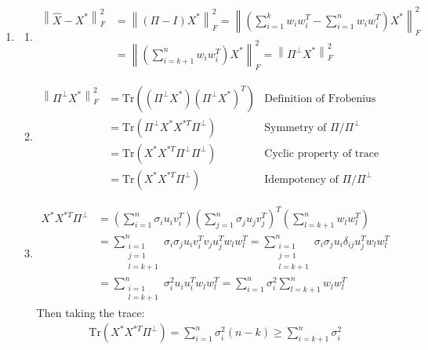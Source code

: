 \documentclass{article}
\newcommand{\norm}[1]{\left\|#1\right\|}
\begin{document}
\begin{enumerate}
    \item
    \begin{enumerate}
        \item
        \begin{align*}
            \norm{\hat{X} - X^*}_F^2 
            &= \norm{(\Pi - I)X^*}_F^2
            = \norm{\left(\sum_{i=1}^k w_i w_i^T - \sum_{i=1}^n w_i w_i^T \right)X^*}_F^2 \\
            &= \norm{\left(\sum_{i=k+1}^n w_i w_i^T\right)X^*}_F^2
            = \norm{\Pi^\perp X^*}_F^2
        \end{align*}

        \item
        \begin{align*}
            \norm{\Pi^\perp X^*}_F^2 
            &= \mathrm{Tr}((\Pi^\perp X^*) (\Pi^\perp X^*)^T) & \text{Definition of Frobenius Norm}\\
            &= \mathrm{Tr}(\Pi^\perp X^* X^{*T} \Pi^\perp) & \text{Symmetry of } \Pi / \Pi^\perp \\
            &= \mathrm{Tr}(X^* X^{*T} \Pi^\perp \Pi^\perp) & \text{Cyclic property of trace} \\
            &= \mathrm{Tr}(X^* X^{*T} \Pi^\perp) & \text{Idempotency of } \Pi / \Pi^\perp
        \end{align*}

        \item 
        \begin{align*}    
            X^* X^{*T} \Pi^\perp
            &= \left( \sum_{i=1}^n \sigma_i u_i v_i^T \right)
            \left( \sum_{j=1}^n \sigma_j u_j v_j^T \right)^T
            \left( \sum_{l=k+1}^n w_l w_l^T \right) \\
            &= \sum_{\substack{i=1 \\ j=1 \\ l=k+1}}^n 
            \sigma_i \sigma_j u_i v_i^T v_j u_j^T w_l w_l^T
            = \sum_{\substack{i=1 \\ j=1 \\ l=k+1}}^n
            \sigma_i \sigma_j u_i \delta_{ij} u_j^T w_l w_l^T \\
            &= \sum_{\substack{i=1 \\ l=k+1}}^n 
            \sigma_i^2 u_i u_i^T w_l w_l^T 
            = \sum_{i=1}^n \sigma_i^2 \sum_{l=k+1}^n w_l w_l^T
        \end{align*}
        Then taking the trace:
        \begin{align*}
            \mathrm{Tr}(X^* X^{*T} \Pi^\perp)
            = \sum_{i=1}^n \sigma_i^2 (n-k)
            \geq \sum_{i=k+1}^n \sigma_i^2
        \end{align*}
    \end{enumerate}


\end{enumerate}
\end{document}

